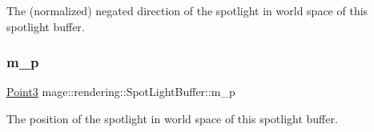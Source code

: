 The (normalized) negated direction of the spotlight in world space of this spotlight buffer. \mbox{\label{structmage_1_1rendering_1_1_spot_light_buffer_aea38ba213d99bbdf0c36ce27bc0c64c5}} 
\subsubsection{\texorpdfstring{m\+\_\+p}{m\_p}}
{\footnotesize\ttfamily \mbox{\hyperlink{structmage_1_1_point3}{Point3}} mage\+::rendering\+::\+Spot\+Light\+Buffer\+::m\+\_\+p}

The position of the spotlight in world space of this spotlight buffer. 
